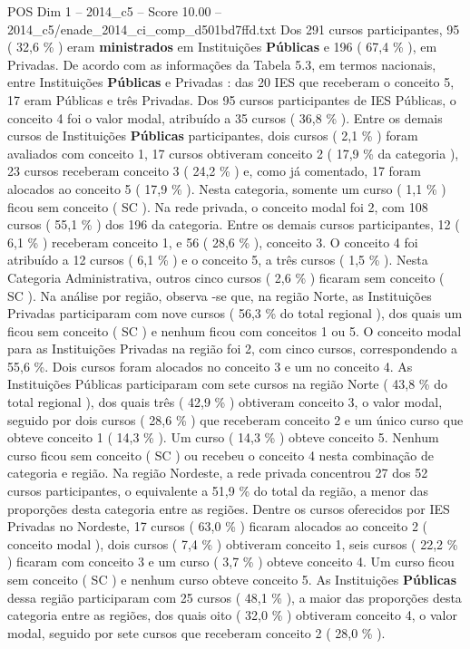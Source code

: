 \begin{textsample}{POS Dim 1 – 2014\_c5 – Score 10.00 – 2014\_c5/enade\_2014\_ci\_comp\_d501bd7ffd.txt}
Dos 291 cursos participantes, 95 ( 32,6 \% ) eram \textbf{ministrados} em Instituições \textbf{Públicas} e 196 ( 67,4 \% ), em Privadas.
De acordo com as informações da Tabela 5.3, em termos nacionais, entre Instituições \textbf{Públicas} e Privadas : das 20 IES que receberam o conceito 5, 17 eram Públicas e três Privadas.
Dos 95 cursos participantes de IES Públicas, o conceito 4 foi o valor modal, atribuído a 35 cursos ( 36,8 \% ).
Entre os demais cursos de Instituições \textbf{Públicas} participantes, dois cursos ( 2,1 \% ) foram avaliados com conceito 1, 17 cursos obtiveram conceito 2 ( 17,9 \% da categoria ), 23 cursos receberam conceito 3 ( 24,2 \% ) e, como já comentado, 17 foram alocados ao conceito 5 ( 17,9 \% ).
Nesta categoria, somente um curso ( 1,1 \% ) ficou sem conceito ( SC ).
Na rede privada, o conceito modal foi 2, com 108 cursos ( 55,1 \% ) dos 196 da categoria.
Entre os demais cursos participantes, 12 ( 6,1 \% ) receberam conceito 1, e 56 ( 28,6 \% ), conceito 3.
O conceito 4 foi atribuído a 12 cursos ( 6,1 \% ) e o conceito 5, a três cursos ( 1,5 \% ).
Nesta Categoria Administrativa, outros cinco cursos ( 2,6 \% ) ficaram sem conceito ( SC ).
Na análise por região, observa -se que, na região Norte, as Instituições Privadas participaram com nove cursos ( 56,3 \% do total regional ), dos quais um ficou sem conceito ( SC ) e nenhum ficou com conceitos 1 ou 5.
O conceito modal para as Instituições Privadas na região foi 2, com cinco cursos, correspondendo a 55,6 \%.
Dois cursos foram alocados no conceito 3 e um no conceito 4.
As Instituições Públicas participaram com sete cursos na região Norte ( 43,8 \% do total regional ), dos quais três ( 42,9 \% ) obtiveram conceito 3, o valor modal, seguido por dois cursos ( 28,6 \% ) que receberam conceito 2 e um único curso que obteve conceito 1 ( 14,3 \% ).
Um curso ( 14,3 \% ) obteve conceito 5.
Nenhum curso ficou sem conceito ( SC ) ou recebeu o conceito 4 nesta combinação de categoria e região.
Na região Nordeste, a rede privada concentrou 27 dos 52 cursos participantes, o equivalente a 51,9 \% do total da região, a menor das proporções desta categoria entre as regiões.
Dentre os cursos oferecidos por IES Privadas no Nordeste, 17 cursos ( 63,0 \% ) ficaram alocados ao conceito 2 ( conceito modal ), dois cursos ( 7,4 \% ) obtiveram conceito 1, seis cursos ( 22,2 \% ) ficaram com conceito 3 e um curso ( 3,7 \% ) obteve conceito 4.
Um curso ficou sem conceito ( SC ) e nenhum curso obteve conceito 5.
As Instituições \textbf{Públicas} dessa região participaram com 25 cursos ( 48,1 \% ), a maior das proporções desta categoria entre as regiões, dos quais oito ( 32,0 \% ) obtiveram conceito 4, o valor modal, seguido por sete cursos que receberam conceito 2 ( 28,0 \% ).

\end{textsample}
